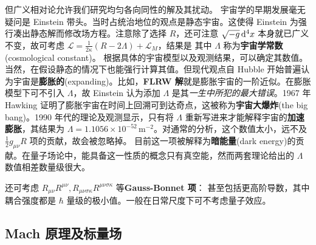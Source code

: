 但广义相对论允许我们研究均匀各向同性的解及其扰动。
宇宙学的早期发展毫无疑问是 Einstein 带头。当时占统治地位的观点是静态宇宙。这使得 Einstein 为强行凑出静态解而修改场方程。注意除了选择 $R$，还可注意 $\sqrt{-g}\dd[4]{x}$ 本身就已广义不变，故可考虑 $\mathcal L=\frac{1}{2\kappa}\left(R-2\Lambda\right)+\mathcal L_M$，结果是
其中 $\Lambda$ 称为\textbf{宇宙学常数}(cosmological constant)。
根据具体的宇宙模型以及观测结果，可以确定其数值。
当然，在假设静态的情况下也能强行计算其值。但现代观点自 Hubble 开始普遍认为宇宙是\textbf{膨胀的}(expanding)。比如，\textbf{FLRW 解}就是膨胀宇宙的一阶近似。在膨胀模型下可不引入 $\Lambda$，故 Einstein 认为添加 $\Lambda$ 是其\textit{一生中所犯的最大错误}。1967 年 Hawking 证明了膨胀宇宙在时间上回溯可到达奇点，这被称为\textbf{宇宙大爆炸}(the big bang)。1990 年代的理论及观测显示，只有将 $\Lambda$ 重新写进来才能解释宇宙的\textbf{加速膨胀}，其结果为 $\Lambda=1.1056\times 10^{-52}$\,m$^{-2}$。对通常的分析，这个数值太小，远不及 $\frac12 g_{\mu\nu} R$ 项的贡献，故会被忽略掉。
目前这一项被解释为\textbf{暗能量}(dark energy)的贡献。在量子场论中，能具备这一性质的概念只有真空能，然而两套理论给出的 $\Lambda$ 数值相差数量级很大。

还可考虑 $R_{\mu\nu} R^{\mu\nu},R_{\mu\nu\sigma\kappa}R^{\mu\nu\sigma\kappa}$ 等\textbf{Gauss-Bonnet 项}：
甚至包括更高阶导数，其中耦合强度都是 $\hbar$ 量级的极小值。一般在日常尺度下可不考虑量子效应。

\subsection{Mach 原理及标量场}

